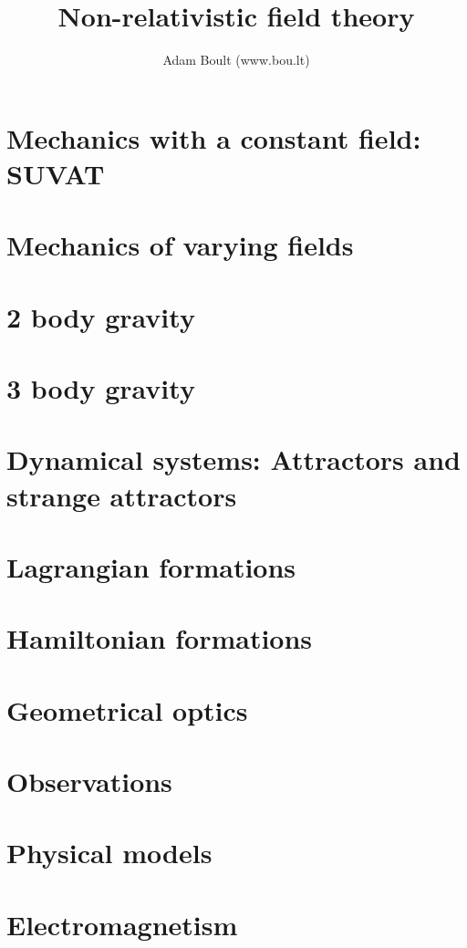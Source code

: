 \documentclass[oneside]{book}
\begin{document}
\author{Adam Boult (www.bou.lt)}
\title{Non-relativistic field theory}
\maketitle

\setcounter{tocdepth}{0}
\tableofcontents



\part{Mechanics with a constant field: SUVAT}


\part{Mechanics of varying fields}




\part{2 body gravity}

\part{3 body gravity}



\part{Dynamical systems: Attractors and strange attractors}

\part{Lagrangian formations}

\part{Hamiltonian formations}


\part{Geometrical optics}

\part{Observations}

\part{Physical models}






\part{Electromagnetism}

\end{document}
